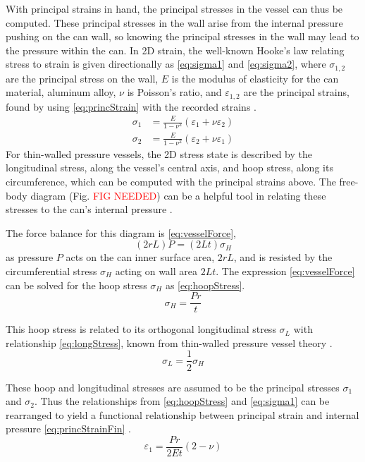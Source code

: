 \documentclass[10pt,journal,letterpaper]{IEEEtran}
\begin{document}
With principal strains in hand, the principal stresses in the vessel can thus be computed.
These principal stresses in the wall arise from the internal pressure pushing on the can wall, so knowing the principal stresses in the wall may lead to the pressure within the can.
In 2D strain, the well-known Hooke’s law relating stress to strain is given directionally as \eqref{eq:sigma1} and \eqref{eq:sigma2}, where $\sigma_{1,2}$ are the principal stress on the wall, $E$ is the modulus of elasticity for the can material, aluminum alloy, $\nu$ is Poisson’s ratio, and $\varepsilon_{1,2}$ are the principal strains, found by using \eqref{eq:princStrain} with the recorded strains \cite{b1}.
\begin{subequations}
\begin{align}
\sigma_1&=\frac{E}{1-\nu^2}\left(\varepsilon_1+\nu\varepsilon_2\right) \label{eq:sigma1} \\
\sigma_2&=\frac{E}{1-\nu^2}\left(\varepsilon_2+\nu\varepsilon_1\right) \label{eq:sigma2}
\end{align}
\end{subequations}
For thin-walled pressure vessels, the 2D stress state is described by the longitudinal stress, along the vessel's central axis, and hoop stress, along its circumference, which can be computed with the principal strains above.
The free-body diagram (Fig. \textcolor{red}{FIG NEEDED}) can be a helpful tool in relating these stresses to the can's internal pressure \cite{b1}.

The force balance for this diagram is \eqref{eq:vesselForce},
\begin{equation}
\label{eq:vesselForce}
(2rL)P=(2Lt)\sigma_H
\end{equation}
as pressure $P$ acts on the can inner surface area, $2rL$, and is resisted by the circumferential stress $\sigma_H$ acting on wall area $2Lt$.
The expression \eqref{eq:vesselForce} can be solved for the hoop stress $\sigma_H$ as \eqref{eq:hoopStress}.
\begin{equation}
\label{eq:hoopStress}
\sigma_H=\frac{Pr}{t}
\end{equation}

This hoop stress is related to its orthogonal longitudinal stress $\sigma_L$ with relationship \eqref{eq:longStress}, known from thin-walled pressure vessel theory \cite{b1}.
\begin{equation}
\label{eq:longStress}
\sigma_L=\frac{1}{2}\sigma_H
\end{equation}

These hoop and longitudinal stresses are assumed to be the principal stresses $\sigma_1$ and $\sigma_2$.
Thus the relationships from \eqref{eq:hoopStress} and \eqref{eq:sigma1} can be rearranged to yield a functional relationship between principal strain and internal pressure \eqref{eq:princStrainFin} \cite{b1}.
\begin{equation}
\label{eq:princStrainFin}
\varepsilon_1=\frac{Pr}{2Et}(2-\nu)
\end{equation}
\end{document}

